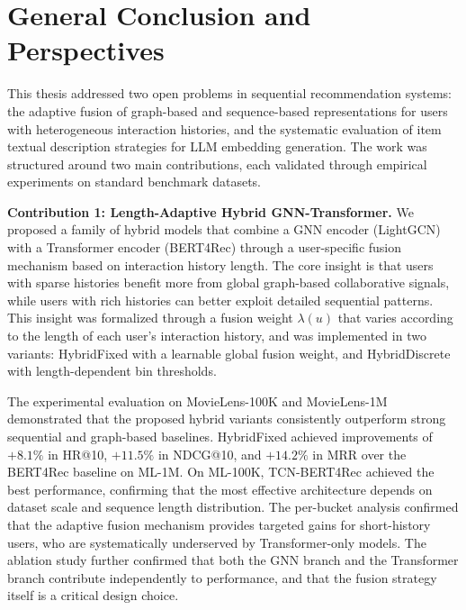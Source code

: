 \documentclass[12pt,a4paper]{report}
\begin{document}
\chapter*{General Conclusion and Perspectives}

\justifying
This thesis addressed two open problems in sequential recommendation systems:
the adaptive fusion of graph-based and sequence-based representations for users
with heterogeneous interaction histories, and the systematic evaluation of item
textual description strategies for LLM embedding generation. The work was
structured around two main contributions, each validated through empirical
experiments on standard benchmark datasets.

\textbf{Contribution 1: Length-Adaptive Hybrid GNN-Transformer.}
We proposed a family of hybrid models that combine a GNN encoder (LightGCN)
with a Transformer encoder (BERT4Rec) through a user-specific fusion mechanism
based on interaction history length. The core insight is that users with sparse
histories benefit more from global graph-based collaborative signals, while
users with rich histories can better exploit detailed sequential patterns. This
insight was formalized through a fusion weight \(\lambda(u)\) that varies
according to the length of each user's interaction history, and was implemented
in two variants: \mbox{HybridFixed} with a learnable global fusion weight, and
HybridDiscrete with length-dependent bin thresholds.

The experimental evaluation on MovieLens-100K and MovieLens-1M demonstrated
that the proposed hybrid variants consistently outperform strong sequential and
graph-based baselines. \mbox{HybridFixed} achieved improvements of \(+8.1\%\) in
HR@10, \(+11.5\%\) in NDCG@10, and \(+14.2\%\) in MRR over the BERT4Rec
baseline on ML-1M. On ML-100K, TCN-BERT4Rec achieved the best performance,
confirming that the most effective architecture depends on dataset scale and
sequence length distribution. The per-bucket analysis confirmed that the
adaptive fusion mechanism provides targeted gains for short-history users, who
are systematically underserved by Transformer-only models. The ablation study
further confirmed that both the GNN branch and the Transformer branch
contribute independently to performance, and that the fusion strategy itself is
a critical design choice.
\end{document}
